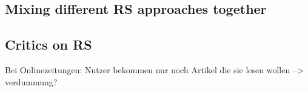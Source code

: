 \subsection{Mixing different RS approaches together}

\subsection{Critics on RS}
Bei Onlinezeitungen: Nutzer bekommen nur noch Artikel die sie lesen wollen --> verdummung?
